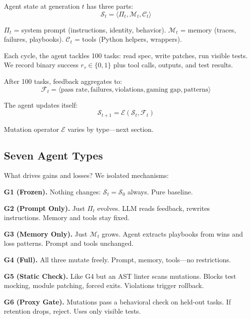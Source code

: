 \documentclass[conference]{IEEEtran}
\begin{document}
Agent state at generation $t$ has three parts:
\begin{equation}
\mathcal{S}_t = \langle \Pi_t, \mathcal{M}_t, \mathcal{C}_t \rangle
\end{equation}

$\Pi_t$ = system prompt (instructions, identity, behavior).  
$\mathcal{M}_t$ = memory (traces, failures, playbooks).  
$\mathcal{C}_t$ = tools (Python helpers, wrappers).

Each cycle, the agent tackles 100 tasks: read spec, write patches, run visible tests. We record binary success $r_\tau \in \{0,1\}$ plus tool calls, outputs, and test results.

After 100 tasks, feedback aggregates to:
\begin{equation}
\mathcal{F}_t = \langle \text{pass rate}, \text{failures}, \text{violations}, \text{gaming gap}, \text{patterns} \rangle
\end{equation}

The agent updates itself:
\begin{equation}
\mathcal{S}_{t+1} = \mathcal{E}(\mathcal{S}_t, \mathcal{F}_t)
\end{equation}

Mutation operator $\mathcal{E}$ varies by type—next section.

\subsection{Seven Agent Types}

What drives gains and losses? We isolated mechanisms:

\textbf{G1 (Frozen).} Nothing changes: $\mathcal{S}_t = \mathcal{S}_0$ always. Pure baseline.

\textbf{G2 (Prompt Only).} Just $\Pi_t$ evolves. LLM reads feedback, rewrites instructions. Memory and tools stay fixed.

\textbf{G3 (Memory Only).} Just $\mathcal{M}_t$ grows. Agent extracts playbooks from wins and loss patterns. Prompt and tools unchanged.

\textbf{G4 (Full).} All three mutate freely. Prompt, memory, tools—no restrictions.

\textbf{G5 (Static Check).} Like G4 but an AST linter scans mutations. Blocks test mocking, module patching, forced exits. Violations trigger rollback.

\textbf{G6 (Proxy Gate).} Mutations pass a behavioral check on held-out tasks. If retention drops, reject. Uses only visible tests.
\end{document}
